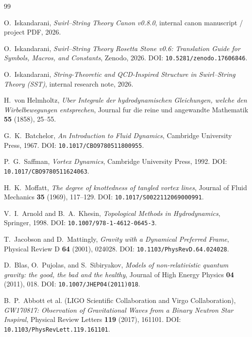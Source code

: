 \documentclass[11pt,a4paper]{article}
\begin{document}
\begin{thebibliography}{99}

O.~Iskandarani,
\textit{Swirl--String Theory Canon v0.8.0},
internal canon manuscript / project PDF, 2026.

O.~Iskandarani,
\textit{Swirl--String Theory Rosetta Stone v0.6: Translation Guide for Symbols, Macros, and Constants},
Zenodo, 2026.
DOI: \texttt{10.5281/zenodo.17606846}.

O.~Iskandarani,
\textit{String-Theoretic and QCD-Inspired Structure in Swirl--String Theory (SST)},
internal research note, 2026.

H.~von Helmholtz,
\textit{Uber Integrale der hydrodynamischen Gleichungen, welche den Wirbelbewegungen entsprechen},
Journal fur die reine und angewandte Mathematik \textbf{55} (1858), 25--55.

G.~K.~Batchelor,
\textit{An Introduction to Fluid Dynamics},
Cambridge University Press, 1967.
DOI: \texttt{10.1017/CBO9780511800955}.

P.~G.~Saffman,
\textit{Vortex Dynamics},
Cambridge University Press, 1992.
DOI: \texttt{10.1017/CBO9780511624063}.

H.~K.~Moffatt,
\textit{The degree of knottedness of tangled vortex lines},
Journal of Fluid Mechanics \textbf{35} (1969), 117--129.
DOI: \texttt{10.1017/S0022112069000991}.

V.~I.~Arnold and B.~A.~Khesin,
\textit{Topological Methods in Hydrodynamics},
Springer, 1998.
DOI: \texttt{10.1007/978-1-4612-0645-3}.

T.~Jacobson and D.~Mattingly,
\textit{Gravity with a Dynamical Preferred Frame},
Physical Review D \textbf{64} (2001), 024028.
DOI: \texttt{10.1103/PhysRevD.64.024028}.

D.~Blas, O.~Pujolas, and S.~Sibiryakov,
\textit{Models of non-relativistic quantum gravity: the good, the bad and the healthy},
Journal of High Energy Physics \textbf{04} (2011), 018.
DOI: \texttt{10.1007/JHEP04(2011)018}.

B.~P.~Abbott et al. (LIGO Scientific Collaboration and Virgo Collaboration),
\textit{GW170817: Observation of Gravitational Waves from a Binary Neutron Star Inspiral},
Physical Review Letters \textbf{119} (2017), 161101.
DOI: \texttt{10.1103/PhysRevLett.119.161101}.


\end{thebibliography}
\end{document}
